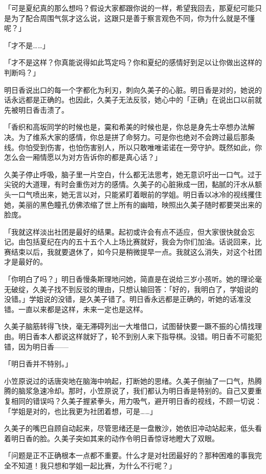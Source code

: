 \documentclass[UTF8]{ctexart}
\begin{document}
    「可是夏纪真的那么想吗？假设大家都跟你说的一样，希望我回去，那夏纪可能只是为了配合周围气氛才这么说，这跟只是善于察言观色不同，你为什么就是不懂呢？」 

    「才不是……」 

    「才不是这样？你真能说得如此笃定吗？你和夏纪的感情好到足以让你做出这样的判断吗？」 

    明日香说出口的每一个字都化为利刃，刺向久美子的心脏。明日香是对的，她说的话永远都是正确的。也因此，久美子无法反驳，她心中的「正确」在说出口以前就先被明日香击溃了。 

    「香织和高坂同学的时候也是，霙和希美的时候也是，你总是身先士卒想办法解决。为了维系大家的感情，你总是拼了命努力。可是你也绝对不会跨过最后那条线。你怕受到伤害，也怕伤害别人，所以只敢唯唯诺诺在一旁守护。既然如此，你怎么会一厢情愿以为对方告诉你的都是真心话？」 

    久美子停止呼吸，脑子里一片空白，什么都无法思考，她无意识吁出一口气。过于尖锐的大道理，有时会重伤对方的感情。久美子的心脏揪成一团，黏腻的汗水从额头一口气喷出来，她无言以对，只能紧盯着眼前的学姐。明日香以冰冷的视线攫住她，美丽的黑色瞳孔仿佛浓缩了世上所有的幽暗，映照出久美子随时都要哭出来的脸庞。 

    「我就这样淡出社团是最好的结果。起初或许会有点不适应，但大家很快就会忘记。由包括夏纪在内的五十五个人上场比赛就好，我会为你们加油。话说回来，比赛结束以后，我就要退休了，如今只是稍微提早一点。我就这么消失，对这个社团才是最好的。 

    「你明白了吗？」明日香慢条斯理地问她，简直是在说给三岁小孩听。她的理论毫无破绽，久美子找不到反驳的理由，只想认输回答：「好的，我明白了，学姐说的没错。」学姐说的没错，是久美子错了。明日香永远都是正确的，听她的话准没错。一直以来都是这样，未来一定也是这样。 

    久美子脑筋转得飞快，毫无滞碍列出一大堆借口，试图替快要一蹶不振的心情找理由。明日香本人都说这样就好了，轮不到别人来下指导棋。没错。明日香不可能犯错，因为明日香—— 

    「明日香并不特别。」 

    小笠原说过的话唐突地在脑海中响起，打断她的思绪。久美子倒抽了一口气，热腾腾的脑浆急速冷却。那时，小笠原说了，我们都认为明日香是特别的。自己又要重复相同的错误吗？久美子握紧拳头，用力吸气，避开明日香的视线，不顾一切说：「学姐是对的，也比我更为社团着想，可是……」 

    久美子的嘴巴自顾自动起来，尽管思绪还是一盘散沙，她依旧冲动站起来，低头看着明日香的脸。久美子突如其来的动作令明日香惊讶地瞪大了双眼。 

    「问题是正不正确根本一点都不重要。什么才是对社团最好的？那种困难的事我完全不知道！我只想和学姐一起比赛，为什么不行呢？」 
\end{document}
